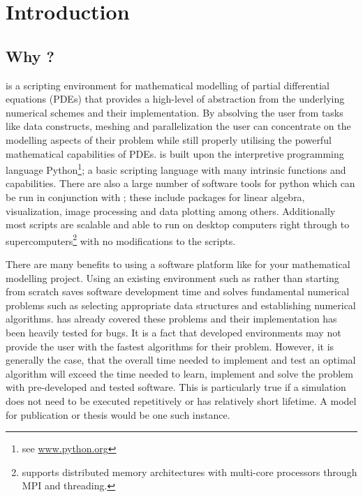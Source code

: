 
%
%
%

\chapter{Introduction}
\label{CHAP INTRO}
\section{Why \esc?}
\esc is a scripting environment for mathematical modelling of partial differential equations (PDEs) that provides a high-level of abstraction from the underlying numerical schemes and their implementation. By absolving the user from tasks like data constructs, meshing and parallelization the user can concentrate on the modelling aspects of their problem while still properly utilising the powerful mathematical capabilities of PDEs. \esc is built upon the interpretive programming language Python\footnote{see \url{www.python.org}}; a basic scripting language with many intrinsic functions and capabilities. There are also a large number of software tools for python which can be run in conjunction with \esc; these include packages for linear algebra, visualization, image processing and data plotting among others. Additionally most \esc scripts are scalable and able to run on desktop computers right through to supercomputers\footnote{\esc supports distributed memory architectures with multi-core processors through MPI and threading.} with no modifications to the scripts. 

There are many benefits to using a software platform like \esc for your mathematical modelling project. Using an existing environment such as \esc rather than starting from scratch saves software development time and solves fundamental numerical problems such as selecting appropriate data structures and establishing numerical algorithms. \esc has already covered these problems and their implementation has been heavily tested for bugs. It is a fact that developed environments may not provide the user with the fastest algorithms for their problem. However, it is generally the case, that the overall time needed to implement and test an optimal algorithm will exceed the time needed to learn, implement and solve the problem with pre-developed and tested software. This is particularly true if a simulation does not need to be executed repetitively or has relatively short lifetime. A model for publication or thesis would be one such instance. 

